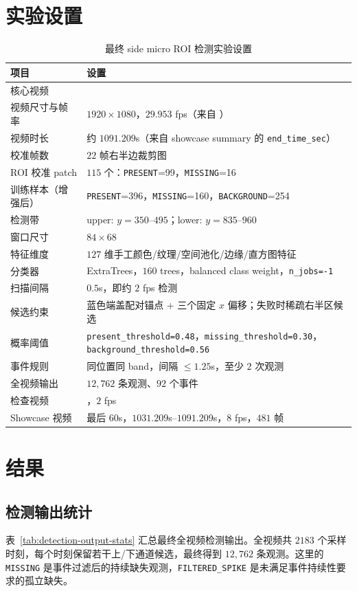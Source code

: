 \documentclass[a4paper,12pt]{article}
\newcommand{\code}[1]{\texttt{#1}}
\begin{document}
\section{实验设置}
\begin{table}[H]
\centering
\caption{最终 side micro ROI 检测实验设置}
\label{tab:experimental-setup}
\small
\begin{tabularx}{\textwidth}{L{0.34\textwidth}Y}
\toprule
项目 & 设置 \\
\midrule
核心视频 &  \\
视频尺寸与帧率 & $1920\times1080$，$29.953$ fps（来自 ） \\
视频时长 & 约 $1091.209$s（来自 showcase summary 的 \code{end\_time\_sec}） \\
校准帧数 & $22$ 帧右半边裁剪图 \\
ROI 校准 patch & $115$ 个：\code{PRESENT}=99，\code{MISSING}=16 \\
训练样本（增强后） & \code{PRESENT}=396，\code{MISSING}=160，\code{BACKGROUND}=254 \\
检测带 & upper: $y=350$--$495$；lower: $y=835$--$960$ \\
窗口尺寸 & $84\times68$ \\
特征维度 & $127$ 维手工颜色/纹理/空间池化/边缘/直方图特征 \\
分类器 & ExtraTrees，$160$ trees，balanced class weight，\code{n\_jobs=-1} \\
扫描间隔 & $0.5$s，即约 $2$ fps 检测 \\
候选约束 & 蓝色端盖配对锚点 + 三个固定 $x$ 偏移；失败时稀疏右半区候选 \\
概率阈值 & \code{present\_threshold=0.48}，\code{missing\_threshold=0.30}，\code{background\_threshold=0.56} \\
事件规则 & 同位置同 band，间隔 $\leq1.25$s，至少 $2$ 次观测 \\
全视频输出 & $12{,}762$ 条观测、$92$ 个事件 \\
检查视频 & ，$2$ fps \\
Showcase 视频 & 最后 $60$s，$1031.209$s--$1091.209$s，$8$ fps，$481$ 帧 \\
\bottomrule
\end{tabularx}
\end{table}
\newpage
\section{结果}
\subsection{检测输出统计}
表~\ref{tab:detection-output-stats} 汇总最终全视频检测输出。全视频共 $2183$ 个采样时刻，每个时刻保留若干上/下通道候选，最终得到 $12{,}762$ 条观测。这里的 \code{MISSING} 是事件过滤后的持续缺失观测，\code{FILTERED\_SPIKE} 是未满足事件持续性要求的孤立缺失。
\end{document}
